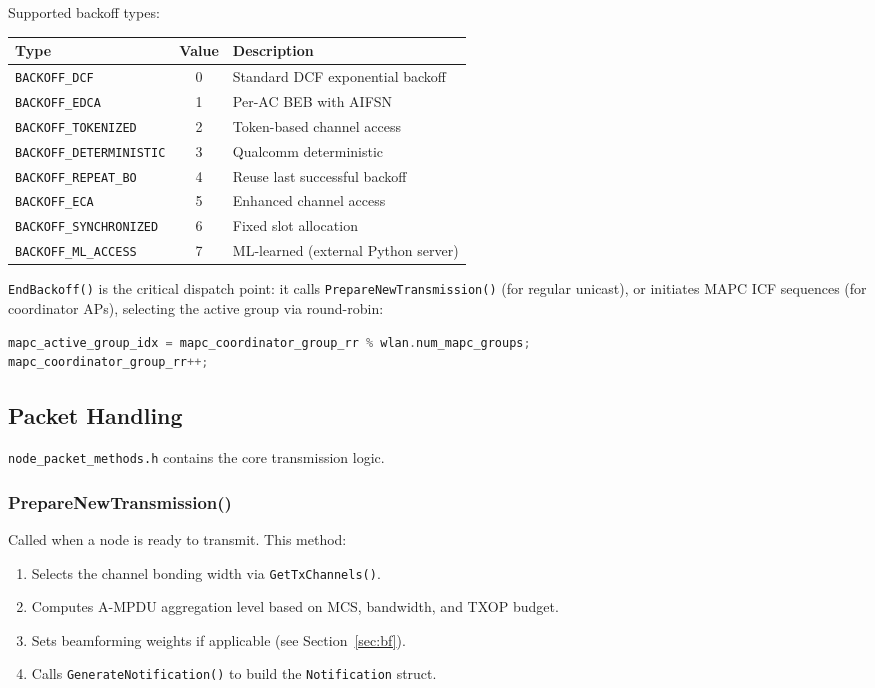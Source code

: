 \documentclass[11pt,a4paper]{article}
\begin{document}
Supported backoff types:
\begin{longtable}{l c l}
\toprule
\textbf{Type} & \textbf{Value} & \textbf{Description} \\
\midrule
\texttt{BACKOFF\_DCF}         & 0 & Standard DCF exponential backoff \\
\texttt{BACKOFF\_EDCA}        & 1 & Per-AC BEB with AIFSN \\
\texttt{BACKOFF\_TOKENIZED}   & 2 & Token-based channel access \\
\texttt{BACKOFF\_DETERMINISTIC} & 3 & Qualcomm deterministic \\
\texttt{BACKOFF\_REPEAT\_BO}  & 4 & Reuse last successful backoff \\
\texttt{BACKOFF\_ECA}         & 5 & Enhanced channel access \\
\texttt{BACKOFF\_SYNCHRONIZED}& 6 & Fixed slot allocation \\
\texttt{BACKOFF\_ML\_ACCESS}  & 7 & ML-learned (external Python server) \\
\bottomrule
\end{longtable}

\texttt{EndBackoff()} is the critical dispatch point: it calls \texttt{PrepareNewTransmission()} (for regular unicast), or initiates MAPC ICF sequences (for coordinator APs), selecting the active group via round-robin:

\begin{lstlisting}[language=C++]
mapc_active_group_idx = mapc_coordinator_group_rr % wlan.num_mapc_groups;
mapc_coordinator_group_rr++;
\end{lstlisting}

\subsection{Packet Handling}
\label{sec:packets}

\texttt{node\_packet\_methods.h} contains the core transmission logic.

\subsubsection{PrepareNewTransmission()}

Called when a node is ready to transmit.  This method:
\begin{enumerate}[nosep]
  \item Selects the channel bonding width via \texttt{GetTxChannels()}.
  \item Computes A-MPDU aggregation level based on MCS, bandwidth, and TXOP budget.
  \item Sets beamforming weights if applicable (see Section~\ref{sec:bf}).
  \item Calls \texttt{GenerateNotification()} to build the \texttt{Notification} struct.
\end{enumerate}
\end{document}
